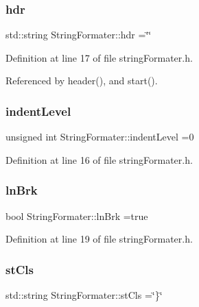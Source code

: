 \subsubsection{\texorpdfstring{hdr}{hdr}}
{\footnotesize\ttfamily std\+::string String\+Formater\+::hdr =\char`\"{}\char`\"{}\hspace{0.3cm}{\ttfamily [private]}}



Definition at line 17 of file string\+Formater.\+h.



Referenced by header(), and start().

\mbox{\label{classStringFormater_a6e7f3ad35026161d483da43928ddba01}} 
\subsubsection{\texorpdfstring{indent\+Level}{indentLevel}}
{\footnotesize\ttfamily unsigned int String\+Formater\+::indent\+Level =0\hspace{0.3cm}{\ttfamily [private]}}



Definition at line 16 of file string\+Formater.\+h.

\mbox{\label{classStringFormater_afb5df3fdcd0de7289d2a53c9e62dff7c}} 
\subsubsection{\texorpdfstring{ln\+Brk}{lnBrk}}
{\footnotesize\ttfamily bool String\+Formater\+::ln\+Brk =true\hspace{0.3cm}{\ttfamily [private]}}



Definition at line 19 of file string\+Formater.\+h.

\mbox{\label{classStringFormater_a16da4f4ac44449b3da5c2c18bfb08ef1}} 
\subsubsection{\texorpdfstring{st\+Cls}{stCls}}
{\footnotesize\ttfamily std\+::string String\+Formater\+::st\+Cls =\char`\"{}\}\char`\"{}\hspace{0.3cm}{\ttfamily [private]}}



